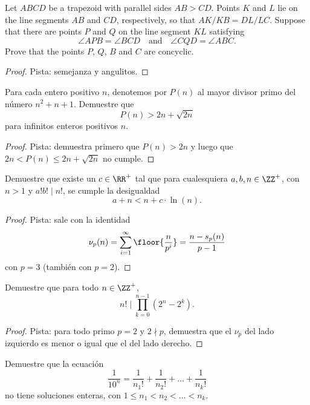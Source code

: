 \begin{probEG}
	Let $ABCD$ be a trapezoid with parallel sides $AB>CD$. Points $K$ and $L$ lie on the line segments $AB$ and $CD$, respectively, so that $AK/KB=DL/LC$. Suppose that there are points $P$ and $Q$ on the line segment $KL$ satisfying
	\[\angle APB=\angle BCD\quad\text{and}\quad\angle CQD=\angle ABC.\]
	Prove that the points $P$, $Q$, $B$ and $C$ are concyclic.
\end{probEG}

\begin{proof}
	Pista: semejanza y angulitos.
\end{proof}

\begin{probEG}
	Para cada entero positivo $n$, denotemos por $P(n)$ al mayor divisor primo del número $n^2+n+1$. Demuestre que
	\[P(n)>2n+\sqrt{2n}\]
	para infinitos enteros positivos $n$.
\end{probEG}

\begin{proof}
	Pista: demuestra primero que $P(n)>2n$ y luego que $2n<P(n)\le 2n+\sqrt{2n}$ no cumple.
\end{proof}

\begin{probEG}
	Demuestre que existe un $c\in\RR^+$ tal que para cualesquiera $a,b,n\in\ZZ^+$, con $n>1$ y $a!b!\mid n!$, se cumple la desigualdad
	\[a+n<n+c\cdot\ln(n).\]
\end{probEG}

\begin{proof}
	Pista: sale con la identidad
	\[\nu_p(n)=\sum_{i=1}^\infty\floor{\frac{n}{p^i}}=\frac{n-s_p(n)}{p-1}\]
	con $p=3$ (también con $p=2$).
\end{proof}

\begin{probEG}
	Demuestre que para todo $n\in\ZZ^+$,
	\[n!\mid\prod_{k=0}^{n-1}(2^n-2^k).\]
\end{probEG}

\begin{proof}
	Pista: para todo primo $p=2$ y $2\nmid p$, demuestra que el $\nu_p$ del lado izquierdo es menor o igual que el del lado derecho.
\end{proof}

\begin{probEG}
	Demuestre que la ecuación
	\[\frac{1}{10^n}=\frac{1}{n_1!}+\frac{1}{n_2!}+\dots+\frac{1}{n_k!}\]
	no tiene soluciones enteras, con $1\le n_1<n_2<\dots<n_k$.
\end{probEG}

